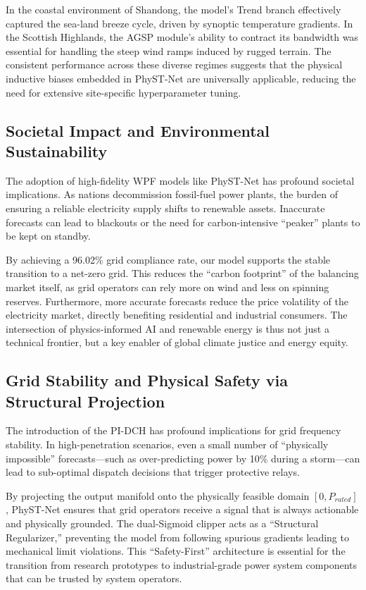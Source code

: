 In the coastal environment of Shandong, the model's Trend branch effectively captured the sea-land breeze cycle, driven by synoptic temperature gradients. In the Scottish Highlands, the AGSP module's ability to contract its bandwidth was essential for handling the steep wind ramps induced by rugged terrain. The consistent performance across these diverse regimes suggests that the physical inductive biases embedded in PhyST-Net are universally applicable, reducing the need for extensive site-specific hyperparameter tuning.

\subsection{Societal Impact and Environmental Sustainability}
\label{sec:societal_impact}
The adoption of high-fidelity WPF models like PhyST-Net has profound societal implications. As nations decommission fossil-fuel power plants, the burden of ensuring a reliable electricity supply shifts to renewable assets. Inaccurate forecasts can lead to blackouts or the need for carbon-intensive ``peaker'' plants to be kept on standby. 

By achieving a 96.02\% grid compliance rate, our model supports the stable transition to a net-zero grid. This reduces the ``carbon footprint'' of the balancing market itself, as grid operators can rely more on wind and less on spinning reserves. Furthermore, more accurate forecasts reduce the price volatility of the electricity market, directly benefiting residential and industrial consumers. The intersection of physics-informed AI and renewable energy is thus not just a technical frontier, but a key enabler of global climate justice and energy equity.

\subsection{Grid Stability and Physical Safety via Structural Projection}
\label{sec:stability_safety}
The introduction of the PI-DCH has profound implications for grid frequency stability. In high-penetration scenarios, even a small number of ``physically impossible'' forecasts---such as over-predicting power by 10\% during a storm---can lead to sub-optimal dispatch decisions that trigger protective relays. 

By projecting the output manifold onto the physically feasible domain $[0, P_{rated}]$, PhyST-Net ensures that grid operators receive a signal that is always actionable and physically grounded. The dual-Sigmoid clipper acts as a ``Structural Regularizer,'' preventing the model from following spurious gradients leading to mechanical limit violations. This ``Safety-First'' architecture is essential for the transition from research prototypes to industrial-grade power system components that can be trusted by system operators.

